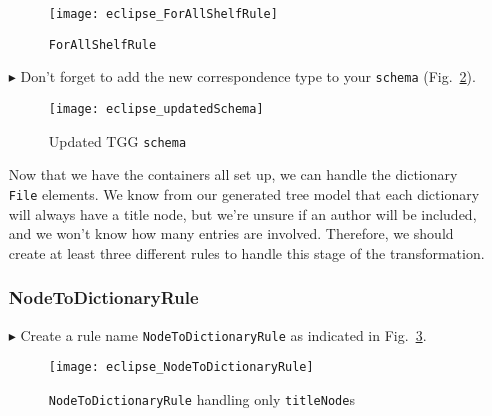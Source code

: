 \begin{itemize}
\vspace{0.5cm}

\begin{figure}[htbp]
\begin{center}
  \texttt{[image: eclipse\_ForAllShelfRule]}
  \caption{\texttt{ForAllShelfRule}}
  \label{eclipse:ForAllShelvesRule}
\end{center}
\end{figure}

\item[$\blacktriangleright$] Don't forget to add the new correspondence type to your \texttt{schema} (Fig.~\ref{eclipse:updatedSchema}).

\vspace{0.5cm}

\begin{figure}[h!]
\begin{center}
  \texttt{[image: eclipse\_updatedSchema]}
  \caption{Updated TGG \texttt{schema}}
  \label{eclipse:updatedSchema}
\end{center}
\end{figure}

\newpage

Now that we have the containers all set up, we can handle the dictionary \texttt{File} elements. We know from our generated tree model that each dictionary will
always have a title node, but we're unsure if an author will be included, and we won't know how many entries are involved. Therefore, we should create at least three
different rules to handle this stage of the transformation. 

\subsubsection{NodeToDictionaryRule} %

\item[$\blacktriangleright$] Create a rule name \texttt{NodeToDictionaryRule} as indicated in Fig.~\ref{eclipse:NodeToDictionaryRule}.

\vspace{0.5cm}

\begin{figure}[htbp]
\begin{center}
  \texttt{[image: eclipse\_NodeToDictionaryRule]}
  \caption{\texttt{NodeToDictionaryRule} handling only \texttt{titleNode}s}
  \label{eclipse:NodeToDictionaryRule}
\end{center}
\end{figure}


\end{itemize}
